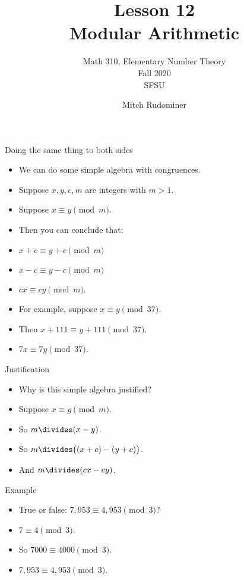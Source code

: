 \documentclass{beamer}
\title{Lesson 12 \\ Modular Arithmetic}
\subtitle{Math 310, Elementary Number Theory \\ Fall 2020 \\ SFSU}
\author{Mitch Rudominer}
\date{}
\begin{document}
\begin{frame}
  \titlepage
\end{frame}

\begin{frame}{Doing the same thing to both sides}

\begin{itemize}
  \item We can do some simple algebra with congruences.
  \item Suppose $x,y,c,m$ are integers with $m>1$.
  \item Suppose $x\equiv y \pmod m$.
  \item Then you can conclude that:
  \item $x+c\equiv y+c \pmod m$
  \item $x-c\equiv y-c \pmod m$
  \item $cx \equiv cy \pmod m$.
  \item For example, suppose $x\equiv y \pmod {37}$.
  \item Then $x+111\equiv y+111 \pmod {37}$.
  \item $7x \equiv 7y \pmod {37}$.
\end{itemize}

\end{frame}

\begin{frame}{Justification}

\begin{itemize}
  \item Why is this simple algebra justified?
  \item Suppose $x\equiv y \pmod m$.
  \item So $m \divides (x-y)$.
  \item So $m \divides \big( (x+c) - (y+c) \big)$.
  \item And $m \divides (cx - cy)$.
\end{itemize}

\end{frame}

\begin{frame}{Example}

\begin{itemize}
  \item True or false: $7,953 \equiv  4,953 \pmod 3$?
  \item $7\equiv 4  \pmod 3$.
  \item So $7000 \equiv 4000 \pmod 3$.
  \item $7,953 \equiv  4,953 \pmod 3$.
\end{itemize}

\end{frame}
\end{document}
